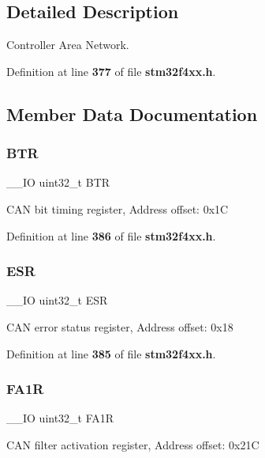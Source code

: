 \subsection{Detailed Description}
Controller Area Network. 

Definition at line \textbf{ 377} of file \textbf{ stm32f4xx.\+h}.



\subsection{Member Data Documentation}
\mbox{\label{structCAN__TypeDef_a5c0fcd3e7b4c59ab1dd68f6bd8f74e07}} 
\subsubsection{B\+TR}
{\footnotesize\ttfamily \+\_\+\+\_\+\+IO uint32\+\_\+t B\+TR}

C\+AN bit timing register, Address offset\+: 0x1C 

Definition at line \textbf{ 386} of file \textbf{ stm32f4xx.\+h}.

\mbox{\label{structCAN__TypeDef_a2b39f943954e0e7d177b511d9074a0b7}} 
\subsubsection{E\+SR}
{\footnotesize\ttfamily \+\_\+\+\_\+\+IO uint32\+\_\+t E\+SR}

C\+AN error status register, Address offset\+: 0x18 

Definition at line \textbf{ 385} of file \textbf{ stm32f4xx.\+h}.

\mbox{\label{structCAN__TypeDef_aaf76271f4ab0b3deb3ceb6e2ac0d62d0}} 
\subsubsection{F\+A1R}
{\footnotesize\ttfamily \+\_\+\+\_\+\+IO uint32\+\_\+t F\+A1R}

C\+AN filter activation register, Address offset\+: 0x21C 

